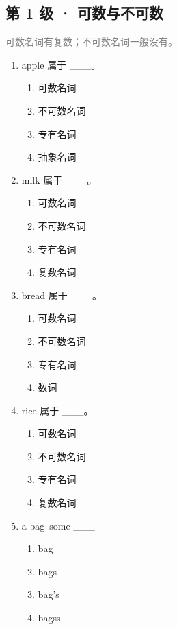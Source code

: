 \documentclass[11pt,a4paper]{ctexart}
\begin{document}
\subsection*{第 1 级 · 可数与不可数}
\noindent\textcolor{gray}{可数名词有复数；不可数名词一般没有。}\par\smallskip
\begin{enumerate}[leftmargin=*,itemsep=4pt]
\item apple 属于 \_\_\_。
\begin{enumerate}[label=\Alph*.,leftmargin=2em,itemsep=1pt,topsep=2pt]
\item 可数名词
\item 不可数名词
\item 专有名词
\item 抽象名词
\end{enumerate}
\item milk 属于 \_\_\_。
\begin{enumerate}[label=\Alph*.,leftmargin=2em,itemsep=1pt,topsep=2pt]
\item 可数名词
\item 不可数名词
\item 专有名词
\item 复数名词
\end{enumerate}
\item bread 属于 \_\_\_。
\begin{enumerate}[label=\Alph*.,leftmargin=2em,itemsep=1pt,topsep=2pt]
\item 可数名词
\item 不可数名词
\item 专有名词
\item 数词
\end{enumerate}
\item rice 属于 \_\_\_。
\begin{enumerate}[label=\Alph*.,leftmargin=2em,itemsep=1pt,topsep=2pt]
\item 可数名词
\item 不可数名词
\item 专有名词
\item 复数名词
\end{enumerate}
\item a bag–some \_\_\_
\begin{enumerate}[label=\Alph*.,leftmargin=2em,itemsep=1pt,topsep=2pt]
\item bag
\item bags
\item bag’s
\item bagss
\end{enumerate}

\end{enumerate}
\end{document}
